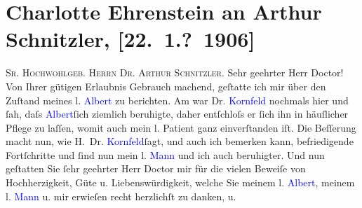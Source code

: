 

               \section[Charlotte Ehrenstein an Arthur Schnitzler, {[}22. 1.? 1906{]}]{ Charlotte Ehrenstein an Arthur Schnitzler, {[}22. 1.? 1906{]}}\nopagebreak{}\rehead{ }\normalsize\beginnumbering{} \toendnotes[C]{\smallbreak\pagebreak[2]} 
\toendnotes[C]{\smallbreak}\pstart
           \noindent{}{\pb}\textsc{Sr. Hochwohlgeb. Herrn Dr. Arthur Schnitzler}.\pend
           \pstart\center{}Sehr geehrter Herr Doctor!\pend\pstart
           Von Ihrer gütigen Erlaubnis Gebrauch machend, geſtatte ich mir über den Zuſtand
                    meines l. \textcolor{blue}{Albert}{}\ledrightnote{\textcolor{blue}{Albert Ehrenstein}} zu berichten. Am \label{K_L01576_1v}\label{K_L01576_1h} war Dr. \textcolor{blue}{Kornfeld}{}\ledrightnote{\textcolor{blue}{Sigmund Kornfeld}} nochmals
                    hier und ſah, daſs \textcolor{blue}{Albert}{}\ledrightnote{\textcolor{blue}{Albert Ehrenstein}}{ }ſich ziemlich beruhigte, daher entſchloſs er
                    ſich ihn in häuſlicher Pflege zu laſſen, womit auch mein l. Patient ganz
                    einverſtanden iſt. Die Beſſerung macht nun, wie H. Dr. \textcolor{blue}{Kornfeld}{}\ledrightnote{\textcolor{blue}{Sigmund Kornfeld}}{ }ſagt, und auch ich bemerken kann,
                    befriedigende Fortſchritte {\pb}und ſind nun mein l. \textcolor{blue}{Mann}{} und ich auch beruhigter.\pend
           \pstart
           Und nun geſtatten Sie ſehr geehrter Herr Doctor mir für die vielen Beweiſe von
                    Hochherzigkeit, Güte u. Liebenswürdigkeit, welche Sie meinem l. \textcolor{blue}{Albert}{}\ledrightnote{\textcolor{blue}{Albert Ehrenstein}}, meinem l. \textcolor{blue}{Mann}{} u. mir erwieſen recht herzlichſt zu danken, u.
